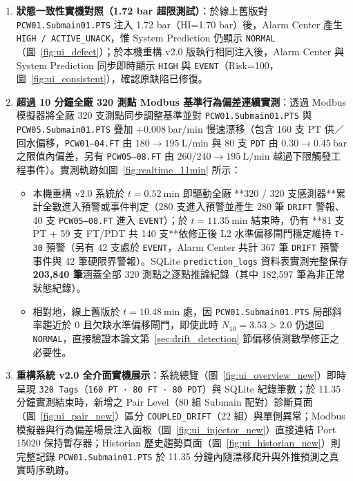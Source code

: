 \documentclass[fontset=none, a4paper, 12pt]{ctexart}
\begin{document}
\begin{doublespace}
\begin{enumerate}
    \item \textbf{狀態一致性實機對照（1.72 bar 超限測試）}：於線上舊版對 \texttt{PCW01.Submain01.PTS} 注入 1.72 bar（HI=1.70 bar）後，Alarm Center 產生 \texttt{HIGH / ACTIVE\_UNACK}，惟 System Prediction 仍顯示 \texttt{NORMAL}（圖~\ref{fig:ui_defect}）；於本機重構 v2.0 版執行相同注入後，Alarm Center 與 System Prediction 同步即時顯示 \texttt{HIGH} 與 \texttt{EVENT}（Risk=100，圖~\ref{fig:ui_consistent}），確認原缺陷已修復。
    \item \textbf{超過 10 分鐘全廠 320 測點 Modbus 基準行為偏差連續實測}：透過 Modbus 模擬器將全廠 320 支測點同步調整基準並對 \texttt{PCW01.Submain01.PTS} 與 \texttt{PCW05.Submain01.PTS} 疊加 $+0.008\ \mathrm{bar/min}$ 慢速漂移（包含 160 支 PT 供／回水偏移，\texttt{PCW01–04.FT} 由 $180\to 195\ \mathrm{L/min}$ 與 80 支 \texttt{PDT} 由 $0.30\to 0.45\ \mathrm{bar}$ 之限值內偏差，另有 \texttt{PCW05–08.FT} 由 $260/240\to 195\ \mathrm{L/min}$ 越過下限觸發工程事件）。實測軌跡如圖~\ref{fig:realtime_11min} 所示：
    \begin{itemize}
        \item 本機重構 v2.0 系統於 $t=0.52\ \mathrm{min}$ 即驅動全廠 **320 / 320 支感測器**累計全數進入預警或事件判定（280 支進入預警並產生 280 筆 \texttt{DRIFT} 警報、40 支 \texttt{PCW05–08.FT} 進入 \texttt{EVENT}）；於 $t=11.35\ \mathrm{min}$ 結束時，仍有 **81 支 PT + 59 支 FT/PDT 共 140 支**依修正後 L2 水準偏移閘門穩定維持 \texttt{T-30} 預警（另有 42 支處於 \texttt{EVENT}，Alarm Center 共計 367 筆 \texttt{DRIFT} 預警事件與 42 筆硬限界警報）。SQLite \texttt{prediction\_logs} 資料表實測完整保存 \textbf{203,840 筆}涵蓋全部 320 測點之逐點推論紀錄（其中 182,597 筆為非正常狀態紀錄）。
        \item 相對地，線上舊版於 $t=10.48\ \mathrm{min}$ 處，因 \texttt{PCW01.Submain01.PTS} 局部斜率趨近於 0 且欠缺水準偏移閘門，即使此時 $N_{10}=3.53 > 2.0$ 仍退回 \texttt{NORMAL}，直接驗證本論文第~\ref{sec:drift_detection} 節偏移偵測數學修正之必要性。
    \end{itemize}
    \item \textbf{重構系統 v2.0 全介面實機展示}：系統總覽（圖~\ref{fig:ui_overview_new}）即時呈現 \texttt{320 Tags}（\texttt{160 PT · 80 FT · 80 PDT}）與 SQLite 紀錄筆數；於 11.35 分鐘實測結束時，新增之 Pair Level（80 組 Submain 配對）診斷頁面（圖~\ref{fig:ui_pair_new}）區分 \texttt{COUPLED\_DRIFT}（22 組）與單側異常；Modbus 模擬器與行為偏差場景注入面板（圖~\ref{fig:ui_injector_new}）直接連結 Port 15020 保持暫存器；Historian 歷史趨勢頁面（圖~\ref{fig:ui_historian_new}）則完整記錄 \texttt{PCW01.Submain01.PTS} 於 11.35 分鐘內隨漂移爬升與外推預測之真實時序軌跡。
\end{enumerate}


\end{doublespace}
\end{document}
